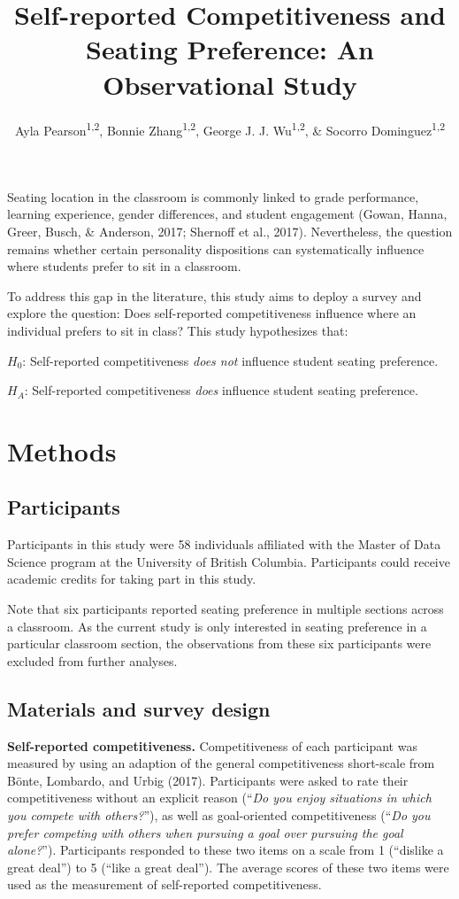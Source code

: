 \documentclass[man]{apa6}
\title{Self-reported Competitiveness and Seating Preference: An Observational Study}
\author{Ayla Pearson\textsuperscript{1,2}, Bonnie Zhang\textsuperscript{1,2}, George J. J. Wu\textsuperscript{1,2}, \& Socorro Dominguez\textsuperscript{1,2}}
\date{}
\affiliation{
\vspace{0.5cm}
\textsuperscript{1} The University of British Columbia\\\textsuperscript{2} Master of Data Science Program}
\begin{document}
\maketitle

Seating location in the classroom is commonly linked to grade performance, learning experience, gender differences, and student engagement (Gowan, Hanna, Greer, Busch, \& Anderson, 2017; Shernoff et al., 2017). Nevertheless, the question remains whether certain personality dispositions can systematically influence where students prefer to sit in a classroom.

To address this gap in the literature, this study aims to deploy a survey and explore the question: Does self-reported competitiveness influence where an individual prefers to sit in class? This study hypothesizes that:

\(H_{0}\): Self-reported competitiveness \emph{does not} influence student seating preference.

\(H_{A}\): Self-reported competitiveness \emph{does} influence student seating preference.

\hypertarget{methods}{%
\section{Methods}\label{methods}}

\hypertarget{participants}{%
\subsection{Participants}\label{participants}}

Participants in this study were 58 individuals affiliated with the Master of Data Science program at the University of British Columbia. Participants could receive academic credits for taking part in this study.

Note that six participants reported seating preference in multiple sections across a classroom. As the current study is only interested in seating preference in a particular classroom section, the observations from these six participants were excluded from further analyses.

\hypertarget{materials-and-survey-design}{%
\subsection{Materials and survey design}\label{materials-and-survey-design}}

\textbf{Self-reported competitiveness.} Competitiveness of each participant was measured by using an adaption of the general competitiveness short-scale from Bönte, Lombardo, and Urbig (2017). Participants were asked to rate their competitiveness without an explicit reason (\enquote{\emph{Do you enjoy situations in which you compete with others?}}), as well as goal-oriented competitiveness (\enquote{\emph{Do you prefer competing with others when pursuing a goal over pursuing the goal alone?}}). Participants responded to these two items on a scale from 1 (\enquote{dislike a great deal}) to 5 (\enquote{like a great deal}). The average scores of these two items were used as the measurement of self-reported competitiveness.
\end{document}
